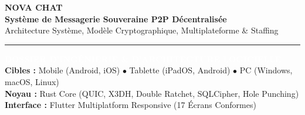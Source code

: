 \documentclass[11pt,a4paper]{article}
\begin{document}
\begin{titlepage}
    \pagecolor{novabg}
    \color{white}
    \begin{center}
        \vspace*{1.5cm}
        
        {\Huge \textbf{\textcolor{novapurple}{NOVA CHAT}}}\\[0.4cm]
        {\Large \textbf{Système de Messagerie Souveraine P2P Décentralisée}}\\[0.2cm]
        {\large \textcolor{novalightgray}{Architecture Système, Modèle Cryptographique, Multiplateforme \& Staffing}}
        
        \vspace{1.2cm}
        \rule{0.8\textwidth}{1.5pt}
        \vspace{1.2cm}
        
        \begin{tcolorbox}[
            enhanced,
            colback=novasurface,
            colframe=novapurple,
            arc=5mm,
            width=0.9\textwidth,
            boxrule=1.5pt,
            center
        ]
            \centering
            \vspace{0.3cm}
            {\large \textbf{\textcolor{white}{DOSSIER D'INGÉNIERIE \& D'ARCHITECTURE LOGICIELLE}}}\\[0.3cm]
            \textcolor{novalightgray}{
                \textbf{Cibles :} Mobile (Android, iOS) $\bullet$ Tablette (iPadOS, Android) $\bullet$ PC (Windows, macOS, Linux)\\[0.15cm]
                \textbf{Noyau :} Rust Core (QUIC, X3DH, Double Ratchet, SQLCipher, Hole Punching)\\[0.15cm]
                \textbf{Interface :} Flutter Multiplatform Responsive (17 Écrans Conformes)
            }
            \vspace{0.3cm}
        \end{tcolorbox}
        
        \vfill
        

\end{center}
\end{titlepage}
\end{document}

